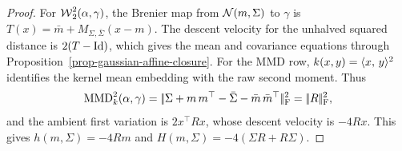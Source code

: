 \begin{proof}
	For \(\operatorname{\mathcal{W}}_2^2(\alpha,\gamma)\), the Brenier map from \(\mathcal{N}(m,\Sigma)\) to \(\gamma\) is
	\(T(x)=\bar m+M_{\Sigma,\bar\Sigma}(x-m)\).
	The descent velocity for the unhalved squared distance is \(2(T-\mathrm{Id})\), which gives the mean and covariance equations through Proposition~\ref{prop-gaussian-affine-closure}. For the MMD row, \(k(x,y)=\langle x,\,y\rangle^2\) identifies the kernel mean embedding with the raw second moment. Thus
	\[
		\operatorname{MMD}_k^2(\alpha,\gamma)
		=
		|\!| \Sigma+m\,m^\top-\bar\Sigma-\bar m\,\bar m^\top |\!|_{\mathrm F}^2
		=
		|\!| R |\!|_{\mathrm F}^2,
	\]
	and the ambient first variation is \(2x^\top R x\), whose descent velocity is \(-4Rx\). This gives \(h(m,\Sigma)=-4R m\) and \(H(m,\Sigma)=-4(\Sigma R+R\Sigma)\).

\end{proof}

